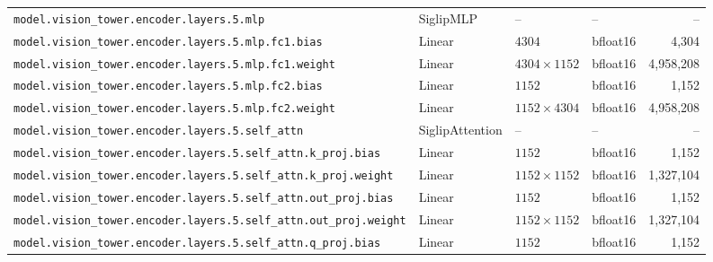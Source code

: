 \documentclass[10pt,a4paper]{article}
\theoremstyle{definition}
\begin{document}
\begin{appendices}
{\begin{longtable}{p{6.8cm}>{\raggedright\arraybackslash}p{3.3cm}llr}
\texttt{model.\allowbreak{}vision\_tower.\allowbreak{}encoder.\allowbreak{}layers.\allowbreak{}5.\allowbreak{}mlp} & Siglip\allowbreak{}MLP & -- & -- & -- \\
\texttt{model.\allowbreak{}vision\_tower.\allowbreak{}encoder.\allowbreak{}layers.\allowbreak{}5.\allowbreak{}mlp.\allowbreak{}fc1.\allowbreak{}bias} & Linear & $4304$ & bfloat16 & 4,304 \\
\texttt{model.\allowbreak{}vision\_tower.\allowbreak{}encoder.\allowbreak{}layers.\allowbreak{}5.\allowbreak{}mlp.\allowbreak{}fc1.\allowbreak{}weight} & Linear & $4304 \times 1152$ & bfloat16 & 4,958,208 \\
\texttt{model.\allowbreak{}vision\_tower.\allowbreak{}encoder.\allowbreak{}layers.\allowbreak{}5.\allowbreak{}mlp.\allowbreak{}fc2.\allowbreak{}bias} & Linear & $1152$ & bfloat16 & 1,152 \\
\texttt{model.\allowbreak{}vision\_tower.\allowbreak{}encoder.\allowbreak{}layers.\allowbreak{}5.\allowbreak{}mlp.\allowbreak{}fc2.\allowbreak{}weight} & Linear & $1152 \times 4304$ & bfloat16 & 4,958,208 \\
\texttt{model.\allowbreak{}vision\_tower.\allowbreak{}encoder.\allowbreak{}layers.\allowbreak{}5.\allowbreak{}self\_attn} & Siglip\allowbreak{}Attention & -- & -- & -- \\
\texttt{model.\allowbreak{}vision\_tower.\allowbreak{}encoder.\allowbreak{}layers.\allowbreak{}5.\allowbreak{}self\_attn.\allowbreak{}k\_proj.\allowbreak{}bias} & Linear & $1152$ & bfloat16 & 1,152 \\
\texttt{model.\allowbreak{}vision\_tower.\allowbreak{}encoder.\allowbreak{}layers.\allowbreak{}5.\allowbreak{}self\_attn.\allowbreak{}k\_proj.\allowbreak{}weight} & Linear & $1152 \times 1152$ & bfloat16 & 1,327,104 \\
\texttt{model.\allowbreak{}vision\_tower.\allowbreak{}encoder.\allowbreak{}layers.\allowbreak{}5.\allowbreak{}self\_attn.\allowbreak{}out\_proj.\allowbreak{}bias} & Linear & $1152$ & bfloat16 & 1,152 \\
\texttt{model.\allowbreak{}vision\_tower.\allowbreak{}encoder.\allowbreak{}layers.\allowbreak{}5.\allowbreak{}self\_attn.\allowbreak{}out\_proj.\allowbreak{}weight} & Linear & $1152 \times 1152$ & bfloat16 & 1,327,104 \\
\texttt{model.\allowbreak{}vision\_tower.\allowbreak{}encoder.\allowbreak{}layers.\allowbreak{}5.\allowbreak{}self\_attn.\allowbreak{}q\_proj.\allowbreak{}bias} & Linear & $1152$ & bfloat16 & 1,152 \\

\end{longtable}}
\end{appendices}
\end{document}
